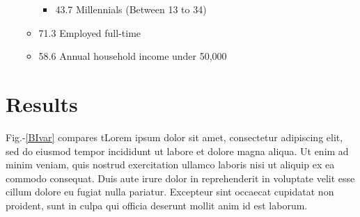 \documentclass[a0,portrait]{a0poster}
\begin{document}
\begin{minipage}[c]{\linewidth}
\begin{framed}
\begin{multicols}{2}
\begin{itemize}
\begin{itemize}
\begin{itemize}
        \item 43.7\text{\%} Millennials (Between 13 to 34)
    \end{itemize}
    \item 71.3\text{\%} Employed full-time
    \item 58.6\text{\%} Annual household income under \text{\$}50,000
\end{itemize}
\end{itemize}
\color{Maroon}
\section*{Results}
\color{Black}
Fig.-\ref{BIvar} compares tLorem ipsum dolor sit amet, consectetur adipiscing elit, sed do eiusmod tempor incididunt ut labore et dolore magna aliqua. Ut enim ad minim veniam, quis nostrud exercitation ullamco laboris nisi ut aliquip ex ea commodo consequat. Duis aute irure dolor in reprehenderit in voluptate velit esse cillum dolore eu fugiat nulla pariatur. Excepteur sint occaecat cupidatat non proident, sunt in culpa qui officia deserunt mollit anim id est laborum.


\end{multicols}
\end{framed}
\end{minipage}
\end{document}
